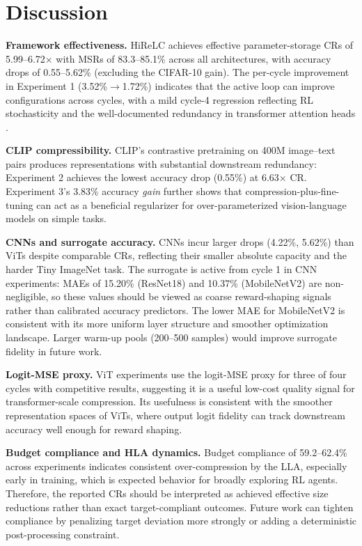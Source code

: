 \documentclass[preprint,12pt,authoryear]{elsarticle}
\begin{document}
\section{Discussion}
\label{sec:discussion}

\textbf{Framework effectiveness.} HiReLC achieves effective parameter-storage CRs of 5.99--6.72$\times$ with MSRs of 83.3--85.1\% across all architectures, with accuracy drops of 0.55--5.62\% (excluding the CIFAR-10 gain). The per-cycle improvement in Experiment 1 (3.52\%$\to$1.72\%) indicates that the active loop can improve configurations across cycles, with a mild cycle-4 regression reflecting RL stochasticity and the well-documented redundancy in transformer attention heads \citep{michel2019heads,voita2019attention}.

\textbf{CLIP compressibility.} CLIP's contrastive pretraining on 400M image--text pairs \citep{radford2021learning} produces representations with substantial downstream redundancy: Experiment 2 achieves the lowest accuracy drop (0.55\%) at 6.63$\times$ CR. Experiment 3's 3.83\% accuracy \emph{gain} further shows that compression-plus-fine-tuning can act as a beneficial regularizer for over-parameterized vision-language models on simple tasks.

\textbf{CNNs and surrogate accuracy.} CNNs incur larger drops (4.22\%, 5.62\%) than ViTs despite comparable CRs, reflecting their smaller absolute capacity and the harder Tiny ImageNet task. The surrogate is active from cycle 1 in CNN experiments: MAEs of 15.20\% (ResNet18) and 10.37\% (MobileNetV2) are non-negligible, so these values should be viewed as coarse reward-shaping signals rather than calibrated accuracy predictors. The lower MAE for MobileNetV2 is consistent with its more uniform layer structure and smoother optimization landscape. Larger warm-up pools (200--500 samples) would improve surrogate fidelity in future work.

\textbf{Logit-MSE proxy.} ViT experiments use the logit-MSE proxy for three of four cycles with competitive results, suggesting it is a useful low-cost quality signal for transformer-scale compression. Its usefulness is consistent with the smoother representation spaces of ViTs, where output logit fidelity can track downstream accuracy well enough for reward shaping.

\textbf{Budget compliance and HLA dynamics.} Budget compliance of 59.2--62.4\% across experiments indicates consistent over-compression by the LLA, especially early in training, which is expected behavior for broadly exploring RL agents. Therefore, the reported CRs should be interpreted as achieved effective size reductions rather than exact target-compliant outcomes. Future work can tighten compliance by penalizing target deviation more strongly or adding a deterministic post-processing constraint.
\end{document}
